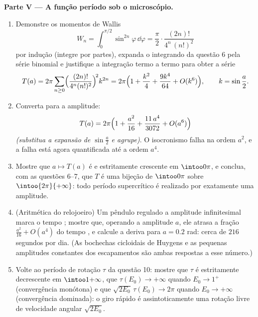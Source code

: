\begin{problem}
\medskip
\noindent\textbf{Parte V --- A função período sob o microscópio.}
\begin{enumerate}[resume]
  \item Demonstre os momentos de Wallis
        \[
        W_n = \int_0^{\pi/2}\sin^{2n}\varphi\,\dd\varphi
        = \frac\pi2\cdot\frac{(2n)!}{4^n\,(n!)^2}
        \]
        por indução (integre por partes), expanda o integrando da
        questão 6 pela série binomial e justifique a integração termo a
        termo para obter a série 
        \[
        T(a) = 2\pi\sum_{n\geq0}
        \Bigl(\frac{(2n)!}{4^n(n!)^2}\Bigr)^{\!2}k^{2n}
        = 2\pi\Bigl(1 + \frac{k^2}4 + \frac{9k^4}{64}
        + O(k^6)\Bigr),
        \qquad k = \sin\frac a2 .
        \]
  \item Converta para a amplitude:
        \[
        T(a) = 2\pi\Bigl(1 + \frac{a^2}{16} +
        \frac{11\,a^4}{3072} + O(a^6)\Bigr)
        \]
        \emph{(substitua a expansão de $\sin\frac a2$ e agrupe)}. O isocronismo
        falha na ordem $a^2$, e a falha está agora quantificada até
        a ordem $a^4$.
  \item Mostre que $a \mapsto T(a)$ é  e estritamente crescente em $\intoo0\pi$, e
        conclua, com as questões 6--7, que $T$ é uma bijeção de $\intoo0\pi$
        sobre $\intoo{2\pi}{+\infty}$: todo período supercrítico é realizado por
        exatamente uma amplitude.
  \item (Aritmética do relojoeiro) Um pêndulo regulado a amplitude
        infinitesimal marca o tempo ; mostre que, operando a
        amplitude $a$, ele atrasa a fração $\frac{a^2}{16} + O(a^4)$ do tempo , e
        calcule a deriva para $a = 0.2$ rad: cerca de $216$ segundos por
        dia. (As bochechas cicloidais de Huygens e as pequenas
        amplitudes constantes dos escapamentos são ambas respostas a
        esse número.)
  \item Volte ao período de rotação $\tau$ da questão 10: mostre que
        $\tau$ é estritamente decrescente em $\intoo1{+\infty}$, que $\tau(E_0) \to +\infty$ quando
        $E_0 \to 1^+$ (convergência monótona) e que $\sqrt{2E_0}\,\tau(E_0) \to 2\pi$ quando $E_0 \to
        +\infty$
        (convergência dominada): o giro rápido é assintoticamente uma
        rotação livre de velocidade angular $\sqrt{2E_0}$.
\end{enumerate}


\end{problem}
